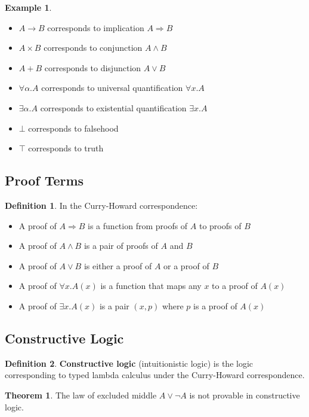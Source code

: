 \documentclass[11pt]{article}
\theoremstyle{definition}
\newtheorem{definition}{Definition}[section]
\newtheorem{theorem}{Theorem}[section]
\newtheorem{example}{Example}[section]
\begin{document}
\begin{example}
\begin{itemize}
    \item $A \to B$ corresponds to implication $A \Rightarrow B$
    \item $A \times B$ corresponds to conjunction $A \land B$
    \item $A + B$ corresponds to disjunction $A \lor B$
    \item $\forall \alpha. A$ corresponds to universal quantification $\forall x. A$
    \item $\exists \alpha. A$ corresponds to existential quantification $\exists x. A$
    \item $\bot$ corresponds to falsehood
    \item $\top$ corresponds to truth
\end{itemize}
\end{example}

\subsection{Proof Terms}
\begin{definition}
In the Curry-Howard correspondence:
\begin{itemize}
    \item A proof of $A \Rightarrow B$ is a function from proofs of $A$ to proofs of $B$
    \item A proof of $A \land B$ is a pair of proofs of $A$ and $B$
    \item A proof of $A \lor B$ is either a proof of $A$ or a proof of $B$
    \item A proof of $\forall x. A(x)$ is a function that maps any $x$ to a proof of $A(x)$
    \item A proof of $\exists x. A(x)$ is a pair $(x, p)$ where $p$ is a proof of $A(x)$
\end{itemize}
\end{definition}

\subsection{Constructive Logic}
\begin{definition}
\textbf{Constructive logic} (intuitionistic logic) is the logic corresponding to typed lambda calculus under the Curry-Howard correspondence.
\end{definition}

\begin{theorem}
The law of excluded middle $A \lor \neg A$ is not provable in constructive logic.
\end{theorem}
\end{document}
